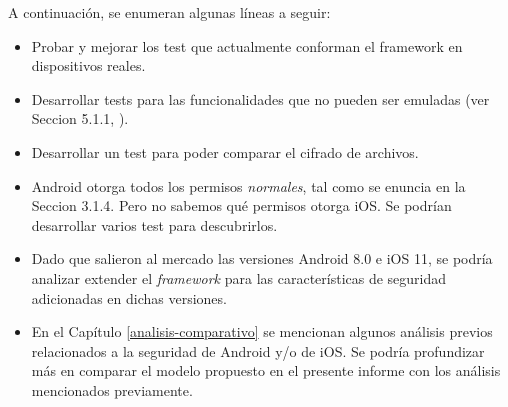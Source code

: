 A continuación, se enumeran algunas líneas a seguir:
\begin{itemize}
    \item Probar y mejorar los test que actualmente conforman el framework en dispositivos reales.
    \item Desarrollar tests para las funcionalidades que no pueden ser emuladas (ver Seccion 5.1.1, \cite{foda, foda2}).
    \item Desarrollar un test para poder comparar el cifrado de archivos.
    \item Android otorga todos los permisos \emph{normales}, tal como se enuncia en la Seccion 3.1.4. Pero no sabemos qué permisos otorga iOS. Se podrían desarrollar varios test para descubrirlos.
    \item Dado que salieron al mercado las versiones Android 8.0 e iOS 11, se podría analizar extender el \emph{framework} para las características de seguridad adicionadas en dichas versiones.
    \item En el Capítulo \ref{analisis-comparativo} se mencionan algunos análisis previos relacionados a la seguridad de Android y/o de iOS. Se podría profundizar más en comparar el modelo propuesto en el presente informe con los análisis mencionados previamente.
\end{itemize}